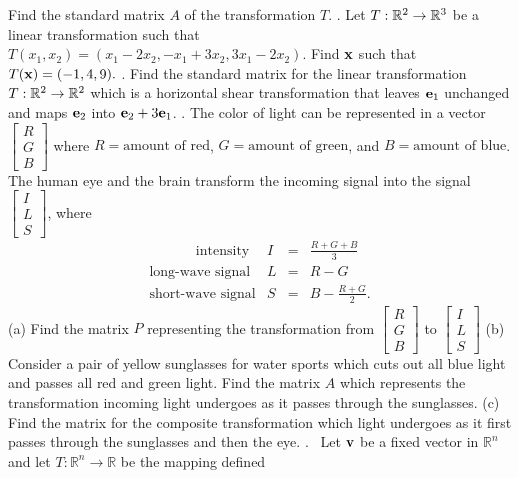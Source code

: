\documentclass[12pt]{article}
\begin{document}
Find the standard matrix $A$ of the transformation $T$.
\vskip 10pt
. Let $T: {\Bbb R}^2 \rightarrow {\Bbb R}^3$ be a linear transformation such that \\
$T(x_1,x_2) = (x_1-2x_2,-x_1+3x_2,3x_1-2x_2).$ Find ${\bf x}$ such that $T({\bf x}) = (-1,4,9).$
\vskip 10pt
. Find the standard matrix for the linear transformation $T: {\Bbb R}^2 \rightarrow {\Bbb R}^2$
which is a horizontal shear transformation that leaves ${\bf e}_1$ unchanged and maps
${\bf e}_2$ into ${\bf e}_2 + 3{\bf e}_1$.
\vskip 10pt
. The color of light can be represented in a vector $\begin{bmatrix} R \\ G \\ B \end{bmatrix}$ where $R = \text{amount of red}$,
$G = \text{amount of green}$, and $B = \text{amount of blue}$. The human eye and the brain transform the incoming signal into the
signal $\begin{bmatrix} I \\ L \\ S\end{bmatrix}$, where
\[
\begin{matrix}
\text{~~~~~~~~~~intensity} & I & = & \frac{R+G+B}{3}\\
\text{long-wave signal} & L & = & R - G \\
\text{short-wave signal} & S & =& B - \frac{R+G}{2}.
\end{matrix}
\]
\vskip 10pt
\noindent
(a) Find the matrix $P$ representing the transformation from  $\begin{bmatrix} R \\ G \\ B \end{bmatrix}$ to
$\begin{bmatrix} I \\ L \\ S\end{bmatrix}$
\vskip 5pt
\noindent
(b) Consider a pair of yellow sunglasses for water sports which cuts out all blue light and passes all red and green light. Find the
matrix $A$ which represents the transformation incoming light undergoes as it passes through the sunglasses.
\vskip 5pt
\noindent
(c) Find the matrix for the composite transformation which light undergoes as it first passes through the sunglasses and then the eye.
\vskip 10pt
.~ Let ${\bf v}$ be a fixed vector in ${\mathbb R}^n$ and let $T: {\mathbb R}^n \rightarrow {\mathbb R}$ be the mapping defined
\end{document}
